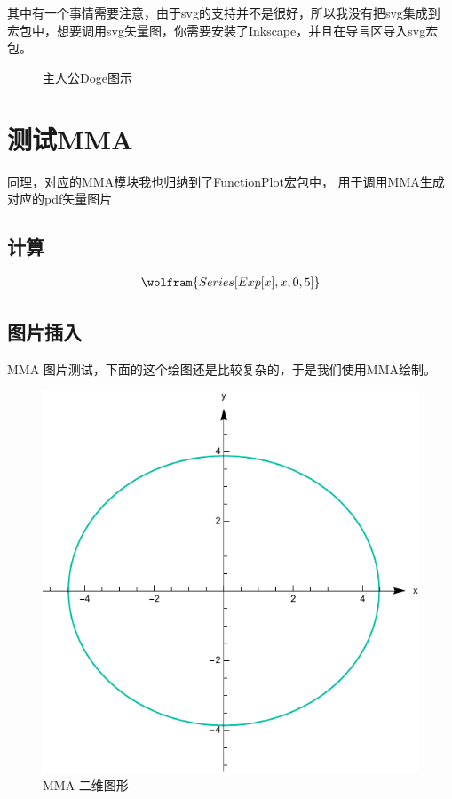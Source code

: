 \documentclass[12pt]{article}
\begin{document}
其中有一个事情需要注意，由于svg的支持并不是很好，所以我没有把svg集成到
宏包中，想要调用svg矢量图，你需要安装了Inkscape，并且在导言区导入svg宏包。

\begin{figure}[!htb]
    \centering
    
    \caption{主人公Doge图示}
    \label{Doge}
\end{figure}


\section{测试MMA}
同理，对应的MMA模块我也归纳到了FunctionPlot宏包中，
用于调用MMA生成对应的pdf矢量图片

\subsection{计算}
\begin{align}
    \wolfram{Series[Exp[x], {x, 0, 5}]}
\end{align}

\subsection{图片插入}
MMA 图片测试，下面的这个绘图还是比较复杂的，于是我们使用MMA绘制。

\begin{figure}[!htb]
    \centering
    \includegraphics[scale=.7]{MMA2d1.pdf}
	\caption{MMA 二维图形}
	\label{MMA 二维图形}
\end{figure}
\end{document}
